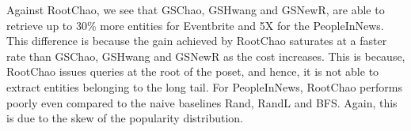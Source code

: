 Against RootChao, we see that GSChao, GSHwang and GSNewR, are able to retrieve up to 30\% more entities for Eventbrite and 5X for the PeopleInNews. This difference is because the gain achieved by RootChao saturates at a faster rate than GSChao, GSHwang and GSNewR as the cost increases. This is because, RootChao issues queries at the root of the poset, and hence, it is not able to extract entities belonging to the long tail. For PeopleInNews, RootChao performs poorly even compared to the naive baselines Rand, RandL and BFS. Again, this is due to the skew of the popularity distribution.

\begin{figure}[h]
\begin{center}

\end{center}
\end{figure}
